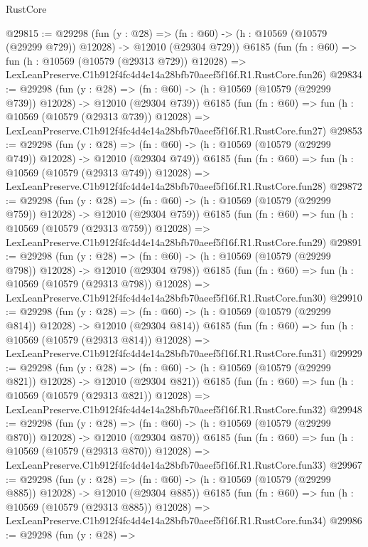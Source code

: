 \begin{lexlean}{RustCore}
\begin{coremodule}
@29815 := @29298
    (fun (y : @28) =>
    (fn : @60) -> (h : @10569 (@10579 (@29299 @729)) @12028) -> @12010 (@29304 @729))
    @6185
    (fun (fn : @60) =>
    fun (h : @10569 (@10579 (@29313 @729)) @12028) =>
    LexLeanPreserve.C1b912f4fc4d4e14a28bfb70aeef5f16f.R1.RustCore.fun26)
@29834 := @29298
    (fun (y : @28) =>
    (fn : @60) -> (h : @10569 (@10579 (@29299 @739)) @12028) -> @12010 (@29304 @739))
    @6185
    (fun (fn : @60) =>
    fun (h : @10569 (@10579 (@29313 @739)) @12028) =>
    LexLeanPreserve.C1b912f4fc4d4e14a28bfb70aeef5f16f.R1.RustCore.fun27)
@29853 := @29298
    (fun (y : @28) =>
    (fn : @60) -> (h : @10569 (@10579 (@29299 @749)) @12028) -> @12010 (@29304 @749))
    @6185
    (fun (fn : @60) =>
    fun (h : @10569 (@10579 (@29313 @749)) @12028) =>
    LexLeanPreserve.C1b912f4fc4d4e14a28bfb70aeef5f16f.R1.RustCore.fun28)
@29872 := @29298
    (fun (y : @28) =>
    (fn : @60) -> (h : @10569 (@10579 (@29299 @759)) @12028) -> @12010 (@29304 @759))
    @6185
    (fun (fn : @60) =>
    fun (h : @10569 (@10579 (@29313 @759)) @12028) =>
    LexLeanPreserve.C1b912f4fc4d4e14a28bfb70aeef5f16f.R1.RustCore.fun29)
@29891 := @29298
    (fun (y : @28) =>
    (fn : @60) -> (h : @10569 (@10579 (@29299 @798)) @12028) -> @12010 (@29304 @798))
    @6185
    (fun (fn : @60) =>
    fun (h : @10569 (@10579 (@29313 @798)) @12028) =>
    LexLeanPreserve.C1b912f4fc4d4e14a28bfb70aeef5f16f.R1.RustCore.fun30)
@29910 := @29298
    (fun (y : @28) =>
    (fn : @60) -> (h : @10569 (@10579 (@29299 @814)) @12028) -> @12010 (@29304 @814))
    @6185
    (fun (fn : @60) =>
    fun (h : @10569 (@10579 (@29313 @814)) @12028) =>
    LexLeanPreserve.C1b912f4fc4d4e14a28bfb70aeef5f16f.R1.RustCore.fun31)
@29929 := @29298
    (fun (y : @28) =>
    (fn : @60) -> (h : @10569 (@10579 (@29299 @821)) @12028) -> @12010 (@29304 @821))
    @6185
    (fun (fn : @60) =>
    fun (h : @10569 (@10579 (@29313 @821)) @12028) =>
    LexLeanPreserve.C1b912f4fc4d4e14a28bfb70aeef5f16f.R1.RustCore.fun32)
@29948 := @29298
    (fun (y : @28) =>
    (fn : @60) -> (h : @10569 (@10579 (@29299 @870)) @12028) -> @12010 (@29304 @870))
    @6185
    (fun (fn : @60) =>
    fun (h : @10569 (@10579 (@29313 @870)) @12028) =>
    LexLeanPreserve.C1b912f4fc4d4e14a28bfb70aeef5f16f.R1.RustCore.fun33)
@29967 := @29298
    (fun (y : @28) =>
    (fn : @60) -> (h : @10569 (@10579 (@29299 @885)) @12028) -> @12010 (@29304 @885))
    @6185
    (fun (fn : @60) =>
    fun (h : @10569 (@10579 (@29313 @885)) @12028) =>
    LexLeanPreserve.C1b912f4fc4d4e14a28bfb70aeef5f16f.R1.RustCore.fun34)
@29986 := @29298
    (fun (y : @28) =>

\end{coremodule}
\end{lexlean}
